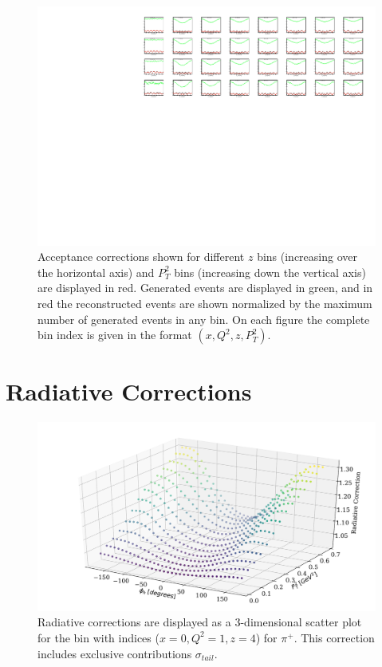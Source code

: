 \begin{figure}
  \centering
  \includegraphics[width=\textwidth]{image/plots/sidis/acceptance.pdf}
  \caption[Acceptance corrections for SIDIS]{Acceptance corrections shown for different $z$ bins (increasing over the horizontal axis) and $P_{T}^{2}$ bins (increasing down the vertical axis) are displayed in red.  Generated events are displayed in green, and in red the reconstructed events are shown normalized by the maximum number of generated events in any bin.  On each figure the complete bin index is given in the format $(x, Q^2, z, P_{T}^{2})$.}
  \label{fig:acceptance}

\end{figure}

\section{Radiative Corrections}

\begin{figure}
	\centering
	\includegraphics[width=\textwidth]{image/plots/sidis/pip_radcorr.pdf}
	\caption[Radiative corrections for $\pi^+$]{Radiative corrections are displayed as a 3-dimensional scatter plot for the bin with indices ($x = 0, Q^2 = 1, z = 4$) for $\pi^+$.  This correction includes exclusive contributions $\sigma_{tail}$.}
	\label{fig:radcorr-pip}	

\end{figure}

